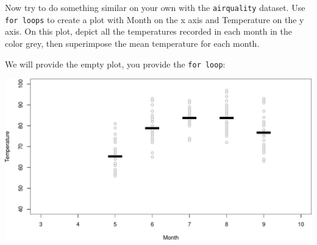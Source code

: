 \documentclass[
]{book}
\newenvironment{Shaded}{\begin{snugshade}}{\end{snugshade}}
\newcommand{\CommentTok}[1]{\textcolor[rgb]{0.56,0.35,0.01}{\textit{#1}}}
\newcommand{\ControlFlowTok}[1]{\textcolor[rgb]{0.13,0.29,0.53}{\textbf{#1}}}
\newcommand{\DataTypeTok}[1]{\textcolor[rgb]{0.13,0.29,0.53}{#1}}
\newcommand{\DecValTok}[1]{\textcolor[rgb]{0.00,0.00,0.81}{#1}}
\newcommand{\KeywordTok}[1]{\textcolor[rgb]{0.13,0.29,0.53}{\textbf{#1}}}
\newcommand{\NormalTok}[1]{#1}
\newcommand{\OperatorTok}[1]{\textcolor[rgb]{0.81,0.36,0.00}{\textbf{#1}}}
\newcommand{\StringTok}[1]{\textcolor[rgb]{0.31,0.60,0.02}{#1}}
\begin{document}
Now try to do something similar on your own with the \texttt{airquality} dataset. Use \texttt{for\ loops} to create a plot with Month on the x axis and Temperature on the y axis. On this plot, depict all the temperatures recorded in each month in the color grey, then superimpose the mean temperature for each month.

We will provide the empty plot, you provide the \texttt{for\ loop}:

\begin{Shaded}
\end{Shaded}

\includegraphics{figures/unnamed-chunk-490-1.pdf}
\end{document}
